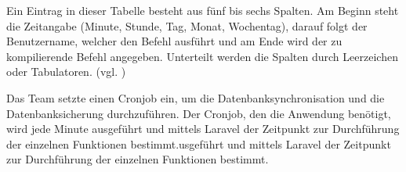Ein Eintrag in dieser Tabelle besteht aus fünf bis sechs Spalten. Am Beginn steht die Zeitangabe (Minute, Stunde, Tag, Monat, Wochentag), darauf folgt der Benutzername, welcher den Befehl ausführt und am Ende wird der zu kompilierende Befehl angegeben. Unterteilt werden die Spalten durch Leerzeichen oder Tabulatoren. (vgl. \cite{cronjob})

Das Team setzte einen Cronjob ein, um die Datenbanksynchronisation und die Datenbanksicherung durchzuführen. Der Cronjob, den die Anwendung benötigt, wird jede Minute ausgeführt und mittels Laravel der Zeitpunkt zur Durchführung der einzelnen Funktionen bestimmt.usgeführt und mittels Laravel der Zeitpunkt zur Durchführung der einzelnen Funktionen bestimmt.